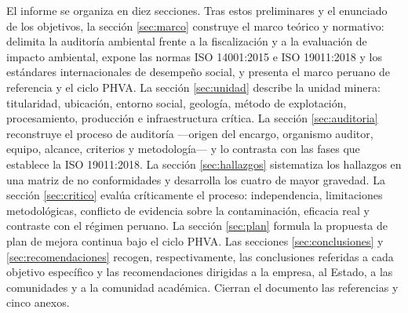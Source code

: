El informe se organiza en diez secciones. Tras estos preliminares y el enunciado
de los objetivos, la sección \ref{sec:marco} construye el marco teórico y
normativo: delimita la auditoría ambiental frente a la fiscalización y a la
evaluación de impacto ambiental, expone las normas ISO 14001:2015 e
ISO 19011:2018 y los estándares internacionales de desempeño social, y presenta el
marco peruano de referencia y el ciclo PHVA. La sección \ref{sec:unidad} describe
la unidad minera: titularidad, ubicación, entorno social, geología, método de
explotación, procesamiento, producción e infraestructura crítica. La sección
\ref{sec:auditoria} reconstruye el proceso de auditoría —origen del encargo,
organismo auditor, equipo, alcance, criterios y metodología— y lo contrasta con
las fases que establece la ISO 19011:2018. La sección \ref{sec:hallazgos}
sistematiza los hallazgos en una matriz de no conformidades y desarrolla los
cuatro de mayor gravedad. La sección \ref{sec:critico} evalúa críticamente el
proceso: independencia, limitaciones metodológicas, conflicto de evidencia sobre
la contaminación, eficacia real y contraste con el régimen peruano. La sección
\ref{sec:plan} formula la propuesta de plan de mejora continua bajo el ciclo PHVA.
Las secciones \ref{sec:conclusiones} y \ref{sec:recomendaciones} recogen,
respectivamente, las conclusiones referidas a cada objetivo específico y las
recomendaciones dirigidas a la empresa, al Estado, a las comunidades y a la
comunidad académica. Cierran el documento las referencias y cinco anexos.
